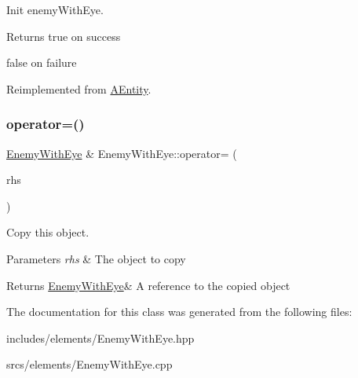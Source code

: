 Init enemy\+With\+Eye. 

\begin{DoxyReturn}{Returns}
true on success 

false on failure 
\end{DoxyReturn}


Reimplemented from \hyperlink{class_a_entity_a450361b684fa02e4ffe0ba406b8e3b30}{A\+Entity}.

\mbox{\label{class_enemy_with_eye_a6ae7fb8ee61d5c6b0bf5eb3e919ac018}} 
\subsubsection{\texorpdfstring{operator=()}{operator=()}}
{\footnotesize\ttfamily \hyperlink{class_enemy_with_eye}{Enemy\+With\+Eye} \& Enemy\+With\+Eye\+::operator= (\begin{DoxyParamCaption}\item[{\hyperlink{class_enemy_with_eye}{Enemy\+With\+Eye} const \&}]{rhs }\end{DoxyParamCaption})}



Copy this object. 


\begin{DoxyParams}{Parameters}
{\em rhs} & The object to copy \\
\hline
\end{DoxyParams}
\begin{DoxyReturn}{Returns}
\hyperlink{class_enemy_with_eye}{Enemy\+With\+Eye}\& A reference to the copied object 
\end{DoxyReturn}


The documentation for this class was generated from the following files\+:\begin{DoxyCompactItemize}
\item 
includes/elements/Enemy\+With\+Eye.\+hpp\item 
srcs/elements/Enemy\+With\+Eye.\+cpp\end{DoxyCompactItemize}
